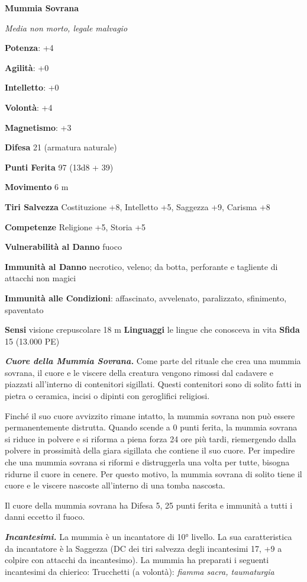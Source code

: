 \begin{multicols}{2}
\textbf{Mummia Sovrana}

\emph{Media non morto, legale malvagio}

\textbf{Potenza}: +4

\textbf{Agilità}: +0

\textbf{Intelletto}: +0

\textbf{Volontà}: +4

\textbf{Magnetismo}: +3

\textbf{Difesa} 21 (armatura naturale)

\textbf{Punti Ferita} 97 (13d8 + 39)

\textbf{Movimento} 6 m

\textbf{Tiri Salvezza} Costituzione +8, Intelletto +5, Saggezza +9,
Carisma +8

\textbf{Competenze} Religione +5, Storia +5

\textbf{Vulnerabilità al Danno} fuoco

\textbf{Immunità al Danno} necrotico, veleno; da botta, perforante e
tagliente di attacchi non magici

\textbf{Immunità alle Condizioni}: affascinato, avvelenato, paralizzato,
sfinimento, spaventato

\textbf{Sensi} visione crepuscolare 18 m
\textbf{Linguaggi} le lingue che conosceva in vita \textbf{Sfida} 15
(13.000 PE)\smallskip

\emph{\textbf{Cuore della Mummia Sovrana.}} Come parte del rituale che
crea una mummia sovrana, il cuore e le viscere della creatura vengono
rimossi dal cadavere e piazzati all'interno di contenitori sigillati.
Questi contenitori sono di solito fatti in pietra o ceramica, incisi o
dipinti con geroglifici religiosi.

Finché il suo cuore avvizzito rimane intatto, la mummia sovrana non può
essere permanentemente distrutta. Quando scende a 0 punti ferita, la
mummia sovrana si riduce in polvere e si riforma a piena forza 24 ore
più tardi, riemergendo dalla polvere in prossimità della giara sigillata
che contiene il suo cuore. Per impedire che una mummia sovrana si
riformi e distruggerla una volta per tutte, bisogna ridurne il cuore in
cenere. Per questo motivo, la mummia sovrana di solito tiene il cuore e
le viscere nascoste all'interno di una tomba nascosta.

Il cuore della mummia sovrana ha Difesa 5, 25 punti ferita e immunità a
tutti i danni eccetto il fuoco.

\emph{\textbf{Incantesimi.}} La mummia è un incantatore di 10° livello.
La sua caratteristica da incantatore è la Saggezza (DC dei tiri salvezza
degli incantesimi 17, +9 a colpire con attacchi da incantesimo). La
mummia ha preparati i seguenti incantesimi da chierico: Trucchetti (a
volontà): \emph{fiamma sacra, taumaturgia}


\end{multicols}
